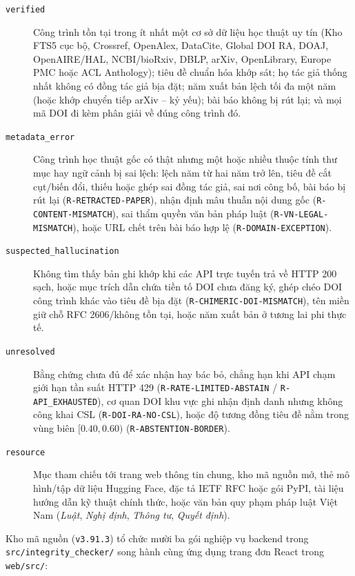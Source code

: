 \begin{description}
    \item[\texttt{verified}] Công trình tồn tại trong ít nhất một cơ sở dữ liệu học thuật uy tín (Kho FTS5 cục bộ, Crossref, OpenAlex, DataCite, Global DOI RA, DOAJ, OpenAIRE/HAL, NCBI/bioRxiv, DBLP, arXiv, OpenLibrary, Europe PMC hoặc ACL Anthology); tiêu đề chuẩn hóa khớp sát; họ tác giả thống nhất không có đồng tác giả bịa đặt; năm xuất bản lệch tối đa một năm (hoặc khớp chuyển tiếp arXiv -- kỷ yếu); bài báo không bị rút lại; và mọi mã DOI đi kèm phân giải về đúng công trình đó.
    \item[\texttt{metadata\_error}] Công trình học thuật gốc có thật nhưng một hoặc nhiều thuộc tính thư mục hay ngữ cảnh bị sai lệch: lệch năm từ hai năm trở lên, tiêu đề cắt cụt/biến đổi, thiếu hoặc ghép sai đồng tác giả, sai nơi công bố, bài báo bị rút lại (\texttt{R-RETRACTED-PAPER}), nhận định mâu thuẫn nội dung gốc (\texttt{R-CONTENT-MISMATCH}), sai thẩm quyền văn bản pháp luật (\texttt{R-VN-LEGAL-MISMATCH}), hoặc URL chết trên bài báo hợp lệ (\texttt{R-DOMAIN-EXCEPTION}).
    \item[\texttt{suspected\_hallucination}] Không tìm thấy bản ghi khớp khi các API trực tuyến trả về HTTP 200 sạch, hoặc mục trích dẫn chứa tiền tố DOI chưa đăng ký, ghép chéo DOI công trình khác vào tiêu đề bịa đặt (\texttt{R-CHIMERIC-DOI-MISMATCH}), tên miền giữ chỗ RFC 2606/không tồn tại, hoặc năm xuất bản ở tương lai phi thực tế.
    \item[\texttt{unresolved}] Bằng chứng chưa đủ để xác nhận hay bác bỏ, chẳng hạn khi API chạm giới hạn tần suất HTTP 429 (\texttt{R-RATE-LIMITED-ABSTAIN} / \texttt{R-API\_EXHAUSTED}), cơ quan DOI khu vực ghi nhận định danh nhưng không công khai CSL (\texttt{R-DOI-RA-NO-CSL}), hoặc độ tương đồng tiêu đề nằm trong vùng biên $[0.40, 0.60)$ (\texttt{R-ABSTENTION-BORDER}).
    \item[\texttt{resource}] Mục tham chiếu tới trang web thông tin chung, kho mã nguồn mở, thẻ mô hình/tập dữ liệu Hugging Face, đặc tả IETF RFC hoặc gói PyPI, tài liệu hướng dẫn kỹ thuật chính thức, hoặc văn bản quy phạm pháp luật Việt Nam (\textit{Luật}, \textit{Nghị định}, \textit{Thông tư}, \textit{Quyết định}).
\end{description}


Kho mã nguồn (\texttt{v3.91.3}) tổ chức mười ba gói nghiệp vụ backend trong \texttt{src/\allowbreak integrity\_checker/} song hành cùng ứng dụng trang đơn React trong \texttt{web/src/}:

